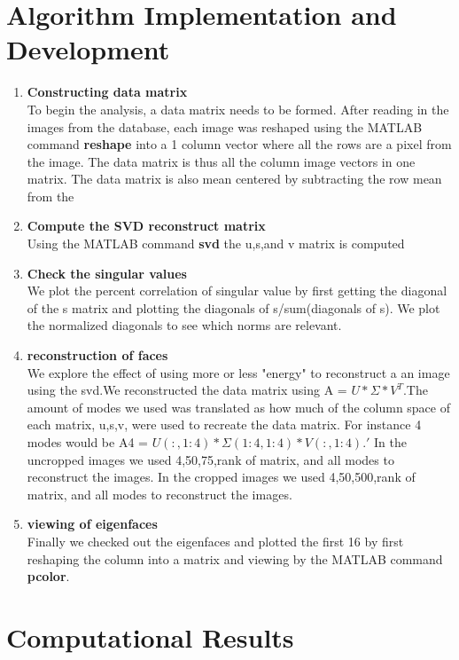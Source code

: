 \documentclass[]{article}
\begin{document}
\section{ Algorithm Implementation and Development }
\begin{enumerate}
	\item \textbf{Constructing data matrix}\\
	To begin the analysis, a data matrix needs to be formed. After reading in the images from the database, each image was reshaped using the MATLAB command \textbf{reshape} into a 1 column vector where all the rows are a pixel from the image. The data matrix is thus all the column image vectors in one matrix. The data matrix is also mean centered by subtracting the row mean from the 
	\item \textbf{Compute the SVD reconstruct matrix}\\
	Using the MATLAB command \textbf{svd} the u,s,and v matrix is computed
	\item \textbf{Check the singular values}\\
	We plot the percent correlation of singular value by first getting the diagonal of the s matrix and plotting the diagonals of s/sum(diagonals of s). We plot the normalized diagonals to see which norms are relevant.
	\item \textbf{reconstruction of faces}\\
	We explore the effect of using more or less "energy" to reconstruct a an image using the svd.We reconstructed the data matrix using A = $U*\Sigma*V^T$.The amount of modes we used was translated as how much of the column space of each matrix, u,s,v, were used to recreate the data matrix. For instance 4 modes would be A4 = $U(:,1:4)*\Sigma(1:4,1:4)*V(:,1:4).'$ In the uncropped images we used 4,50,75,rank of matrix, and all modes to reconstruct the images. In the cropped images we used 4,50,500,rank of matrix, and all modes to reconstruct the images. 
	\item \textbf{viewing of eigenfaces}\\
	Finally we checked out the eigenfaces and plotted the first 16 by first reshaping the column into a matrix and viewing by the MATLAB command \textbf{pcolor}.  
\end{enumerate}

\section{Computational Results}
\end{document}
